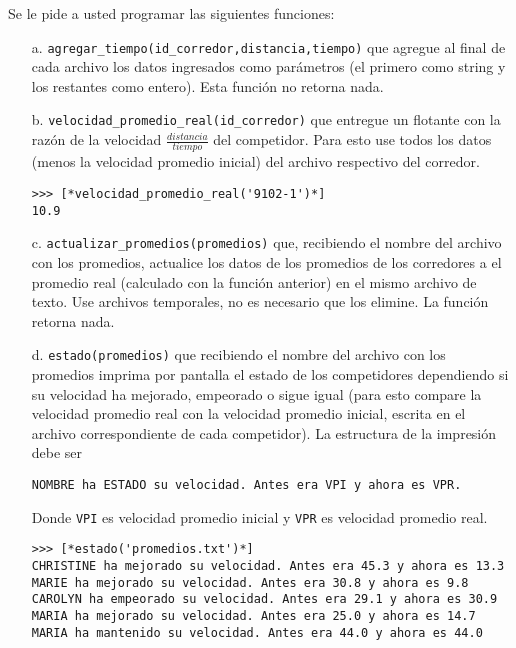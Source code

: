 Se le pide a usted programar las siguientes funciones:
\begin{itemize}
    \item[a.] \texttt{agregar\_tiempo(id\_corredor,distancia,tiempo)} que agregue al final de cada archivo los datos ingresados como parámetros (el primero como string y los restantes como entero). Esta función no retorna nada.
    \item[b.] \texttt{velocidad\_promedio\_real(id\_corredor)} que entregue un flotante con la razón de la velocidad $\frac{distancia}{tiempo}$ del competidor. Para esto use todos los datos (menos la velocidad promedio inicial) del archivo respectivo del corredor.
    \begin{lstlisting}[style=consola]
>>> [*velocidad_promedio_real('9102-1')*]
10.9
    \end{lstlisting}
    \item[c.] \texttt{actualizar\_promedios(promedios)} que, recibiendo el nombre del archivo con los promedios, actualice los datos de los promedios de los corredores a el promedio real (calculado con la función anterior) en el mismo archivo de texto. Use archivos temporales, no es necesario que los elimine. La función retorna nada.
    \item[d.] \texttt{estado(promedios)} que recibiendo el nombre del archivo con los promedios imprima por pantalla el estado de los competidores dependiendo si su velocidad ha mejorado, empeorado o sigue igual (para esto compare la velocidad promedio real con la velocidad promedio inicial, escrita en el archivo correspondiente de cada competidor). La estructura de la impresión debe ser
    \begin{lstlisting}[style=consola]
NOMBRE ha ESTADO su velocidad. Antes era VPI y ahora es VPR.
    \end{lstlisting}
    Donde \texttt{VPI} es velocidad promedio inicial y \texttt{VPR} es velocidad promedio real.
    
    \begin{lstlisting}[style=consola]
>>> [*estado('promedios.txt')*]
CHRISTINE ha mejorado su velocidad. Antes era 45.3 y ahora es 13.3 
MARIE ha mejorado su velocidad. Antes era 30.8 y ahora es 9.8 
CAROLYN ha empeorado su velocidad. Antes era 29.1 y ahora es 30.9 
MARIA ha mejorado su velocidad. Antes era 25.0 y ahora es 14.7 
MARIA ha mantenido su velocidad. Antes era 44.0 y ahora es 44.0
    \end{lstlisting}
\end{itemize}
